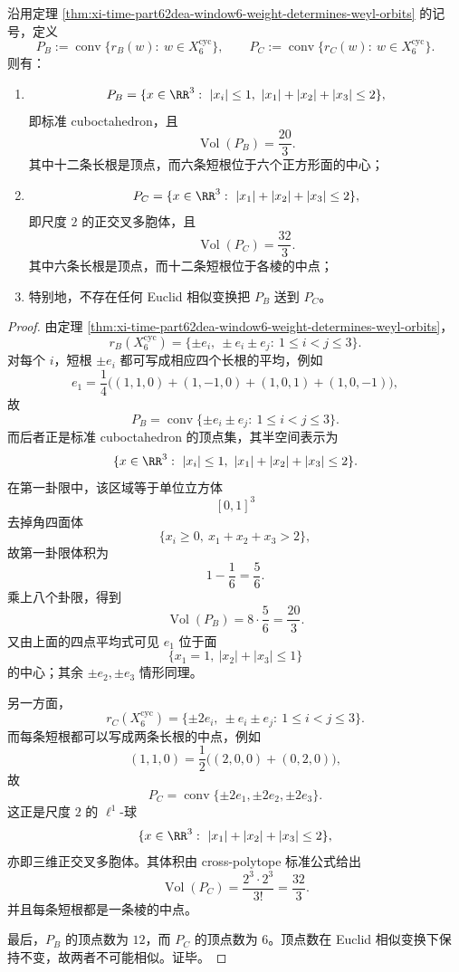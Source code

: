 \begin{theorem}\label{thm:xi-time-part62dea-window6-b3c3-root-polytopes-not-similar}
沿用定理 \ref{thm:xi-time-part62dea-window6-weight-determines-weyl-orbits} 的记号，定义
\[
P_B:=\operatorname{conv}\{r_B(w):\ w\in X_6^{\mathrm{cyc}}\},
\qquad
P_C:=\operatorname{conv}\{r_C(w):\ w\in X_6^{\mathrm{cyc}}\}.
\]
则有：
\begin{enumerate}
  \item
  \[
  P_B
  =
  \{x\in\RR^3:\ |x_i|\le 1,\ |x_1|+|x_2|+|x_3|\le 2\},
  \]
  即标准 cuboctahedron，且
  \[
  \operatorname{Vol}(P_B)=\frac{20}{3}.
  \]
  其中十二条长根是顶点，而六条短根位于六个正方形面的中心；
  \item
  \[
  P_C
  =
  \{x\in\RR^3:\ |x_1|+|x_2|+|x_3|\le 2\},
  \]
  即尺度 \(2\) 的正交叉多胞体，且
  \[
  \operatorname{Vol}(P_C)=\frac{32}{3}.
  \]
  其中六条长根是顶点，而十二条短根位于各棱的中点；
  \item 特别地，不存在任何 Euclid 相似变换把 \(P_B\) 送到 \(P_C\)。
\end{enumerate}
\end{theorem}
\begin{proof}
由定理 \ref{thm:xi-time-part62dea-window6-weight-determines-weyl-orbits}，
\[
r_B(X_6^{\mathrm{cyc}})
=
\{\pm e_i,\ \pm e_i\pm e_j:\ 1\le i<j\le 3\}.
\]
对每个 \(i\)，短根 \(\pm e_i\) 都可写成相应四个长根的平均，例如
\[
e_1=
\frac14\bigl((1,1,0)+(1,-1,0)+(1,0,1)+(1,0,-1)\bigr),
\]
故
\[
P_B=\operatorname{conv}\{\pm e_i\pm e_j:\ 1\le i<j\le 3\}.
\]
而后者正是标准 cuboctahedron 的顶点集，其半空间表示为
\[
\{x\in\RR^3:\ |x_i|\le 1,\ |x_1|+|x_2|+|x_3|\le 2\}.
\]
在第一卦限中，该区域等于单位立方体
\[
[0,1]^3
\]
去掉角四面体
\[
\{x_i\ge 0,\ x_1+x_2+x_3>2\},
\]
故第一卦限体积为
\[
1-\frac16=\frac56.
\]
乘上八个卦限，得到
\[
\operatorname{Vol}(P_B)=8\cdot \frac56=\frac{20}{3}.
\]
又由上面的四点平均式可见 \(e_1\) 位于面
\[
\{x_1=1,\ |x_2|+|x_3|\le 1\}
\]
的中心；其余 \(\pm e_2,\pm e_3\) 情形同理。

另一方面，
\[
r_C(X_6^{\mathrm{cyc}})
=
\{\pm 2e_i,\ \pm e_i\pm e_j:\ 1\le i<j\le 3\}.
\]
而每条短根都可以写成两条长根的中点，例如
\[
(1,1,0)=\frac12\bigl((2,0,0)+(0,2,0)\bigr),
\]
故
\[
P_C=\operatorname{conv}\{\pm 2e_1,\pm 2e_2,\pm 2e_3\}.
\]
这正是尺度 \(2\) 的 \(\ell^1\)-球
\[
\{x\in\RR^3:\ |x_1|+|x_2|+|x_3|\le 2\},
\]
亦即三维正交叉多胞体。其体积由 cross-polytope 标准公式给出
\[
\operatorname{Vol}(P_C)=\frac{2^3\cdot 2^3}{3!}=\frac{32}{3}.
\]
并且每条短根都是一条棱的中点。

最后，\(P_B\) 的顶点数为 \(12\)，而 \(P_C\) 的顶点数为 \(6\)。顶点数在 Euclid 相似变换下保持不变，故两者不可能相似。证毕。
\end{proof}

